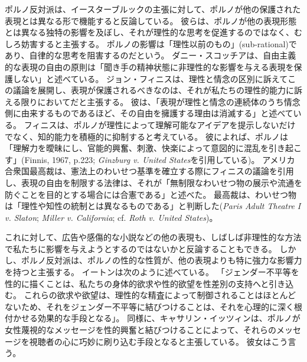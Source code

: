 \documentclass[paper=a4,book,openany]{jlreq}
\begin{document}
ポルノ反対派は、イースターブルックの主張に対して、ポルノが他の保護された表現とは異なる形で機能すると反論している。
彼らは、ポルノが他の表現形態とは異なる独特の影響を及ぼし、それが理性的な思考を促進するのではなく、むしろ妨害すると主張する。
ポルノの影響は「理性以前のもの」(sub-rational)であり、自律的な思考を阻害するのだという。
ダニー・スコッチアは、自由主義的な表現の自由の原則は「聞き手の精神状態に非理性的な影響を与える表現を保護しない」と述べている\citep[p.777]{scoccia96:_can_liber_suppor_ban_violen_pornog}。
ジョン・フィニスは、理性と情念の区別に訴えてこの議論を展開し、表現が保護されるべきなのは、それが私たちの理性的能力に訴える限りにおいてだと主張する。
彼は、「表現が理性と情念の連続体のうち情念側に由来するものであるほど、その自由を擁護する理由は消滅する」と述べている\citep[p.222]{finnis67:_reason_passion}。
フィニスは、ポルノが理性によって理解可能なアイデアを提示しないだけでなく、知的能力を積極的に抑制すると考えている。
彼によれば、ポルノは「理解力を曖昧にし、官能的興奮、刺激、快楽によって意図的に混乱を引き起こす」(Finnis, 1967, p.223; \emph{Ginzburg v. United States}を引用している)。
\nocite{finnis67:_reason_passion}
アメリカ合衆国最高裁は、憲法上のわいせつ基準を確立する際にフィニスの議論を引用し、表現の自由を制限する法律は、それが「無制限なわいせつ物の展示や流通を防ぐことを目的とする場合には合憲である」と述べた。
最高裁は、わいせつ物は「理性や知性の統制とは異なるものである」と判断した(\emph{Paris Adult Theatre I v. Slaton}; \emph{Miller v. California}; cf. \emph{Roth v. United States})。

これに対して、広告や感傷的な小説などの他の表現も、しばしば非理性的な方法で私たちに影響を与えようとするのではないかと反論することもできる。
しかし、ポルノ反対派は、ポルノの性的な性質が、他の表現よりも特に強力な影響力を持つと主張する。
イートンは次のように述べている。
「ジェンダー不平等を性的に描くことは、私たちの身体的欲求や性的欲望を性差別の支持へと引き込む。
これらの欲求や欲望は、理性的な精査によって制御されることはほとんどないため、それをジェンダー不平等に結びつけることは、それを心理的に深く根付かせる効果的な手段となる」\citep[p.679]{eaton07:sensibleantiporn}。
同様に、キャサリン・イッツィンは、ポルノが女性蔑視的なメッセージを性的興奮と結びつけることによって、それらのメッセージを視聴者の心に巧妙に刷り込む手段となると主張している。
彼女はこう言う。
\end{document}
